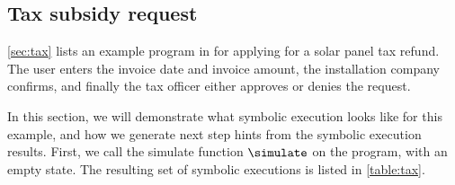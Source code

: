 \subsection{Tax subsidy request}
\label{sec:assistivetax}

\cref{sec:tax} lists an example program in \TOPHAT for applying for a solar panel tax refund.
The user enters the invoice date and invoice amount, the installation company confirms, and finally the tax officer either approves or denies the request.

In this section, we will demonstrate what symbolic execution looks like for this example, and how we generate next step hints from the symbolic execution results.
First, we call the simulate function $\simulate$ on the program, with an empty state.
The resulting set of symbolic executions is listed in \cref{table:tax}.


